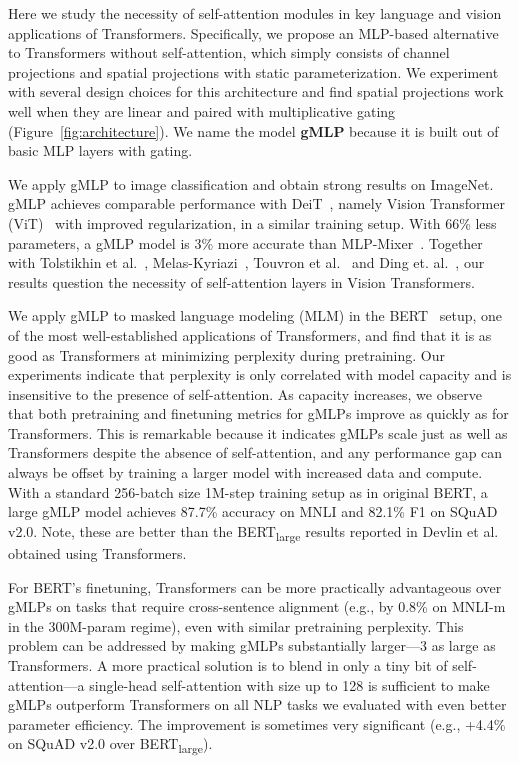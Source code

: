 \documentclass{article}
\newcommand{\gffn}{gMLP\xspace}
\begin{document}
Here we study the necessity of self-attention modules in key language and vision applications of Transformers.
Specifically,
we propose an MLP-based alternative to Transformers without self-attention, which simply consists of channel projections and spatial projections with static parameterization.
We experiment with several design choices for this architecture and find spatial projections
work well when they are linear and paired with multiplicative gating (Figure~\ref{fig:architecture}).
We name the model \textbf{\gffn} because it is built out of basic MLP layers with gating.


We apply \gffn to image classification and obtain strong results on ImageNet. \gffn achieves comparable performance with DeiT~\cite{touvron2020training}, namely Vision Transformer (ViT)~\cite{dosovitskiy2020image} with improved regularization,
in a similar training setup. 
With 66\% less parameters, a \gffn model is 3\% more accurate than MLP-Mixer~\cite{tolstikhin2021mlpmixer}. Together with Tolstikhin et al.~\cite{tolstikhin2021mlpmixer}, Melas-Kyriazi~\cite{melaskyriazi2021doyou}, Touvron et al.~\cite{touvron2021resmlp} and Ding et. al.~\cite{ding2021repmlp}, our results question the necessity of self-attention layers in Vision Transformers.

We apply \gffn to masked language modeling (MLM) in the BERT~\cite{devlin2018bert} setup, one of the most well-established applications of Transformers,
and find that it is as good as Transformers at minimizing perplexity during pretraining.
Our experiments indicate that perplexity is only correlated with model capacity and is insensitive to the presence of self-attention.
As capacity increases, we observe that both pretraining and finetuning metrics for \gffn{s} improve as quickly as for Transformers.
This is remarkable because it indicates \gffn{s} scale just as well as Transformers despite the absence of self-attention, and any performance gap can always be offset by training a larger model with increased data and compute.
With a standard 256-batch size  1M-step training setup as in original BERT, a large gMLP model achieves 87.7\% accuracy on MNLI and 82.1\% F1 on SQuAD v2.0.
Note, these are better than the BERT\textsubscript{large} results reported in Devlin et al.~\cite{devlin2018bert} obtained using Transformers.

For BERT's finetuning, Transformers can be more practically advantageous over \gffn{s} 
on tasks that require cross-sentence alignment (e.g., by 0.8\% on MNLI-m in the 300M-param regime), even with similar pretraining perplexity. This problem can be addressed by making \gffn{s} substantially larger---3 as large as Transformers. A more practical solution is to blend in only a tiny bit of self-attention---a single-head self-attention with size up to 128 is sufficient to make \gffn{s} outperform Transformers on all NLP tasks we evaluated with even better parameter efficiency.
The improvement is sometimes very significant (e.g., +4.4\% on SQuAD v2.0 over BERT\textsubscript{large}).
\end{document}

